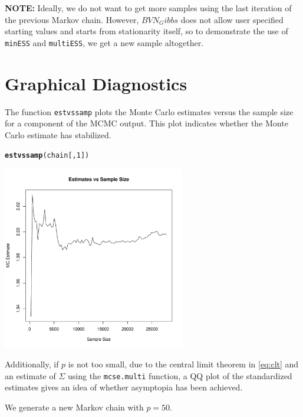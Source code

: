 \documentclass[11pt]{article}\usepackage[]{graphicx}\usepackage[]{color}
\makeatletter
\newcommand{\hlnum}[1]{\textcolor[rgb]{0.686,0.059,0.569}{#1}}%
\newcommand{\hlstd}[1]{\textcolor[rgb]{0.345,0.345,0.345}{#1}}%
\newcommand{\hlkwd}[1]{\textcolor[rgb]{0.737,0.353,0.396}{\textbf{#1}}}%
\newenvironment{kframe}{%
 \def\at@end@of@kframe{}%
 \ifinner\ifhmode%
  \def\at@end@of@kframe{\end{minipage}}%
  \begin{minipage}{\columnwidth}%
 \fi\fi%
 \def\FrameCommand##1{\hskip\@totalleftmargin \hskip-\fboxsep
 \colorbox{shadecolor}{##1}\hskip-\fboxsep
     \hskip-\linewidth \hskip-\@totalleftmargin \hskip\columnwidth}%
 \MakeFramed {\advance\hsize-\width
   \@totalleftmargin\z@ \linewidth\hsize
   \@setminipage}}%
 {\par\unskip\endMakeFramed%
 \at@end@of@kframe}
\newenvironment{knitrout}{}{} %
\makeatother
\begin{document}
\textbf{NOTE:} Ideally, we do not want to get more samples using the last iteration of the previous Markov chain. However, $BVN_Gibbs$ does not allow user specified starting values and starts from stationarity itself, so to demonstrate the use of \texttt{minESS} and \texttt{multiESS}, we get a new sample altogether. 

\section{Graphical Diagnostics}

The function \texttt{estvssamp} plots the Monte Carlo estimates versus the sample size for a component of the MCMC output. This plot indicates whether the Monte Carlo estimate has stabilized.

\begin{knitrout}
\color{fgcolor}\begin{kframe}
\begin{alltt}
\hlkwd{estvssamp}\hlstd{(chain[,}\hlnum{1}\hlstd{])}
\end{alltt}
\end{kframe}
\includegraphics[width=8cm]{figure/estvssamp-1} 

\end{knitrout}

Additionally, if $p$ is not too small, due to the central limit theorem in \eqref{eq:clt} and an estimate of $\Sigma$ using the \texttt{mcse.multi} function, a QQ plot of the standardized estimates gives an idea of whether asymptopia has been achieved.

We generate a new Markov chain with $p = 50$.
\end{document}
